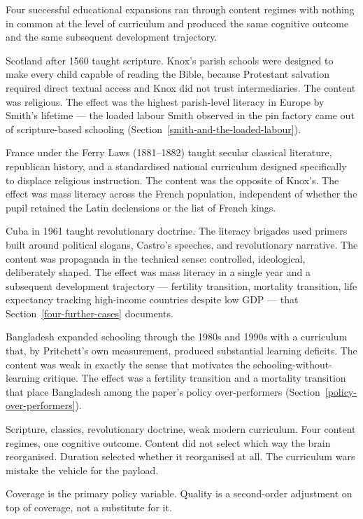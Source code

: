 \documentclass[12pt,letterpaper]{article}
\begin{document}
{Four successful educational expansions ran through content regimes with nothing in common at the level of curriculum and produced the same cognitive outcome and the same subsequent development trajectory.

Scotland after 1560 taught scripture. Knox's parish schools were designed to make every child capable of reading the Bible, because Protestant salvation required direct textual access and Knox did not trust intermediaries. The content was religious. The effect was the highest parish-level literacy in Europe by Smith's lifetime --- the loaded labour Smith observed in the pin factory came out of scripture-based schooling (Section~\ref{smith-and-the-loaded-labour}).

France under the Ferry Laws (1881--1882) taught secular classical literature, republican history, and a standardised national curriculum designed specifically to displace religious instruction. The content was the opposite of Knox's. The effect was mass literacy across the French population, independent of whether the pupil retained the Latin declensions or the list of French kings.

Cuba in 1961 taught revolutionary doctrine. The literacy brigades used primers built around political slogans, Castro's speeches, and revolutionary narrative. The content was propaganda in the technical sense: controlled, ideological, deliberately shaped. The effect was mass literacy in a single year and a subsequent development trajectory --- fertility transition, mortality transition, life expectancy tracking high-income countries despite low GDP --- that Section~\ref{four-further-cases} documents.

Bangladesh expanded schooling through the 1980s and 1990s with a curriculum that, by Pritchett's own measurement, produced substantial learning deficits. The content was weak in exactly the sense that motivates the schooling-without-learning critique. The effect was a fertility transition and a mortality transition that place Bangladesh among the paper's policy over-performers (Section~\ref{policy-over-performers}).

Scripture, classics, revolutionary doctrine, weak modern curriculum. Four content regimes, one cognitive outcome. Content did not select which way the brain reorganised. Duration selected whether it reorganised at all. The curriculum wars mistake the vehicle for the payload.

Coverage is the primary policy variable. Quality is a second-order adjustment on top of coverage, not a substitute for it.

}
\end{document}
